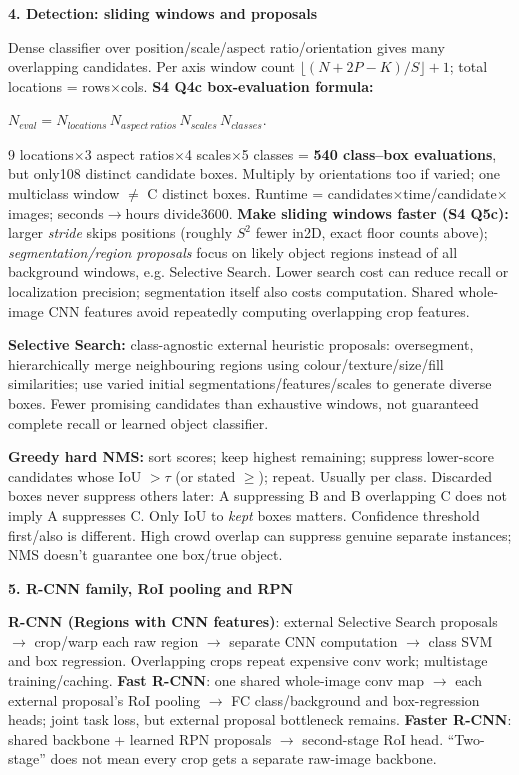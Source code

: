\documentclass[a4paper]{article}
\newcommand{\key}[1]{\textbf{#1}}
\newcommand{\Topic}[1]{\par\vspace{1.7pt}\noindent
  {\fontsize{7.7}{8.0}\selectfont\bfseries #1}\par\vspace{0.3pt}}
\newcommand{\eq}[1]{\par\noindent\mbox{\(\displaystyle #1\)}\par}
\newcounter{sheet}
\newcounter{sheetcolumn}
\newlength{\colwidth}
\newenvironment{sheetcol}[1][7.0]{\stepcounter{sheetcolumn}
  \begin{lrbox}{\columnbox}\begin{minipage}[t]{\colwidth}\vspace{0pt}
  \fontsize{#1}{\dimexpr#1pt+0.6pt\relax}\selectfont}
  {\end{minipage}\end{lrbox}
  \typeout{CV1COL|\thesheet|\thesheetcolumn|\the\dimexpr\ht\columnbox+\dp\columnbox\relax}
  \usebox{\columnbox}\ignorespacesafterend}
\begin{document}
\begin{sheetcol}[6.7]
\Topic{4. Detection: sliding windows and proposals}
Dense classifier over position/scale/aspect ratio/orientation gives many overlapping candidates. Per axis window count \(\lfloor(N+2P-K)/S\rfloor+1\); total locations = rows\(\times\)cols. \key{S4 Q4c box-evaluation formula:}
\eq{N_{eval}=N_{locations}\,N_{aspect\ ratios}\,N_{scales}\,N_{classes}.}
9 locations\(\times\)3 aspect ratios\(\times\)4 scales\(\times\)5 classes = \key{540 class--box evaluations}, but only108 distinct candidate boxes. Multiply by orientations too if varied; one multiclass window \(\ne\) C distinct boxes. Runtime = candidates\(\times\)time/candidate\(\times\)images; seconds\(\to\)hours divide3600.
\key{Make sliding windows faster (S4 Q5c):} larger \emph{stride} skips positions (roughly \(S^2\) fewer in2D, exact floor counts above); \emph{segmentation/region proposals} focus on likely object regions instead of all background windows, e.g. Selective Search. Lower search cost can reduce recall or localization precision; segmentation itself also costs computation. Shared whole-image CNN features avoid repeatedly computing overlapping crop features.

\key{Selective Search:} class-agnostic external heuristic proposals: oversegment, hierarchically merge neighbouring regions using colour/texture/size/fill similarities; use varied initial segmentations/features/scales to generate diverse boxes. Fewer promising candidates than exhaustive windows, not guaranteed complete recall or learned object classifier.

\key{Greedy hard NMS:} sort scores; keep highest remaining; suppress lower-score candidates whose IoU \(>\tau\) (or stated \(\ge\)); repeat. Usually per class. Discarded boxes never suppress others later: A suppressing B and B overlapping C does not imply A suppresses C. Only IoU to \emph{kept} boxes matters. Confidence threshold first/also is different. High crowd overlap can suppress genuine separate instances; NMS doesn't guarantee one box/true object.

\Topic{5. R-CNN family, RoI pooling and RPN}
\key{R-CNN (Regions with CNN features)}: external Selective Search proposals \(\to\) crop/warp each raw region \(\to\) separate CNN computation \(\to\) class SVM and box regression. Overlapping crops repeat expensive conv work; multistage training/caching. \key{Fast R-CNN}: one shared whole-image conv map \(\to\) each external proposal's RoI pooling \(\to\) FC class/background and box-regression heads; joint task loss, but external proposal bottleneck remains. \key{Faster R-CNN}: shared backbone + learned RPN proposals \(\to\) second-stage RoI head. ``Two-stage'' does not mean every crop gets a separate raw-image backbone.


\end{sheetcol}
\end{document}
